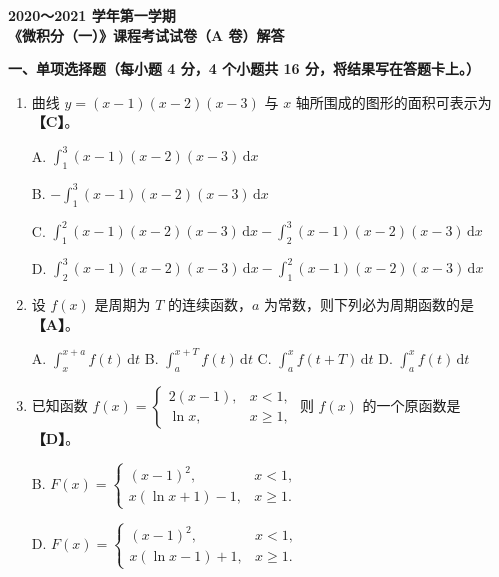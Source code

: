 \documentclass[a4paper,11pt]{ctexart}
\newcommand{\dd}{\,\mathrm{d}}
\begin{document}
\begin{center}
  {\Large\bfseries 2020～2021 学年第一学期}\\[0.5em]
  {\Large\bfseries 《微积分（一）》课程考试试卷（A 卷）解答}
\end{center}

\vspace{0.6em}

\textbf{一、单项选择题（每小题 4 分，4 个小题共 16 分，将结果写在答题卡上。）}

\begin{enumerate}[label=\arabic*., leftmargin=2em, itemsep=0.7em, topsep=0.6em]
  \item 曲线 $y=(x-1)(x-2)(x-3)$ 与 $x$ 轴所围成的图形的面积可表示为 \textbf{【C】}。

  A. $\displaystyle\int_1^3 (x-1)(x-2)(x-3)\dd x$

  B. $-\displaystyle\int_1^3 (x-1)(x-2)(x-3)\dd x$

  C. $\displaystyle\int_1^2 (x-1)(x-2)(x-3)\dd x - \int_2^3 (x-1)(x-2)(x-3)\dd x$

  D. $\displaystyle\int_2^3 (x-1)(x-2)(x-3)\dd x - \int_1^2 (x-1)(x-2)(x-3)\dd x$

  \item 设 $f(x)$ 是周期为 $T$ 的连续函数，$a$ 为常数，则下列必为周期函数的是 \textbf{【A】}。

  A. $\displaystyle\int_x^{x+a} f(t)\dd t$ \qquad\quad
  B. $\displaystyle\int_a^{x+T} f(t)\dd t$ \qquad\quad
  C. $\displaystyle\int_a^x f(t+T)\dd t$ \qquad\quad
  D. $\displaystyle\int_a^x f(t)\dd t$

  \item 已知函数 $f(x)=\begin{cases}2(x-1), & x<1,\\ \ln x, & x\ge 1,\end{cases}$ 则 $f(x)$ 的一个原函数是 \textbf{【D】}。

  B. $F(x)=\begin{cases}(x-1)^2, & x<1,\\ x(\ln x+1)-1, & x\ge 1.\end{cases}$

  \vspace{0.4em}
  D. $F(x)=\begin{cases}(x-1)^2, & x<1,\\ x(\ln x-1)+1, & x\ge 1.\end{cases}$


\end{enumerate}
\end{document}

